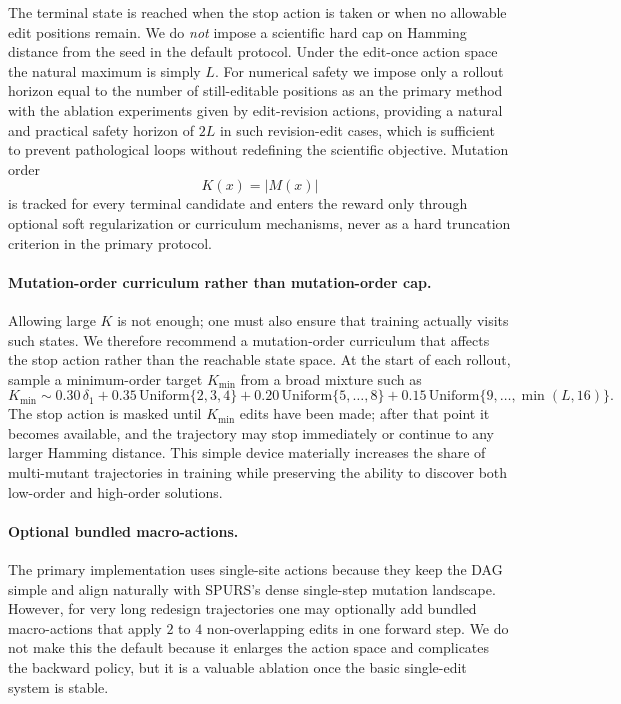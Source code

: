 \documentclass[11pt]{article}
\begin{document}
	The terminal state is reached when the stop action is taken or when no allowable edit positions remain. We do \emph{not} impose a scientific hard cap on Hamming distance from the seed in the default protocol. Under the edit-once action space the natural maximum is simply $L$. For numerical safety we impose only a rollout horizon equal to the number of still-editable positions as an the primary method with the ablation experiments given by edit-revision actions, providing a natural and practical safety horizon of $2L$ in such revision-edit cases, which is sufficient to prevent pathological loops without redefining the scientific objective. Mutation order
	\begin{equation}
		K(x)=|M(x)|
	\end{equation}
	is tracked for every terminal candidate and enters the reward only through optional soft regularization or curriculum mechanisms, never as a hard truncation criterion in the primary protocol.
	
	\paragraph{Mutation-order curriculum rather than mutation-order cap.}
	Allowing large $K$ is not enough; one must also ensure that training actually visits such states. We therefore recommend a mutation-order curriculum that affects the stop action rather than the reachable state space. At the start of each rollout, sample a minimum-order target $K_{\min}$ from a broad mixture such as
	\begin{equation}
		K_{\min}\sim 0.30\,\delta_{1}+0.35\,\mathrm{Uniform}\{2,3,4\}+0.20\,\mathrm{Uniform}\{5,\ldots,8\}+0.15\,\mathrm{Uniform}\{9,\ldots,\min(L,16)\}.
	\end{equation}
	The stop action is masked until $K_{\min}$ edits have been made; after that point it becomes available, and the trajectory may stop immediately or continue to any larger Hamming distance. This simple device materially increases the share of multi-mutant trajectories in training while preserving the ability to discover both low-order and high-order solutions.
	
	\paragraph{Optional bundled macro-actions.}
	The primary implementation uses single-site actions because they keep the DAG simple and align naturally with SPURS's dense single-step mutation landscape. However, for very long redesign trajectories one may optionally add bundled macro-actions that apply $2$ to $4$ non-overlapping edits in one forward step. We do not make this the default because it enlarges the action space and complicates the backward policy, but it is a valuable ablation once the basic single-edit system is stable.
	
\end{document}
